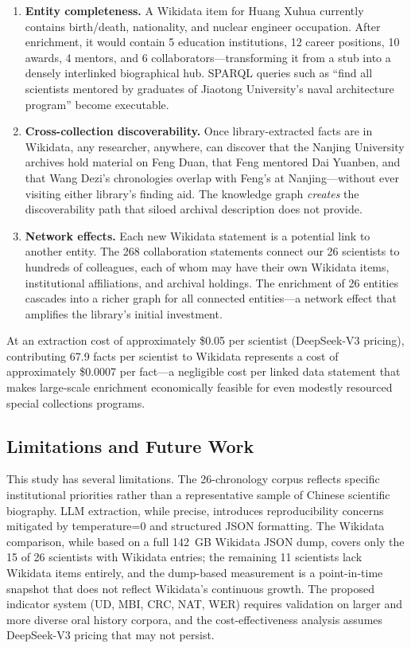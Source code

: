 \documentclass[review]{elsarticle}
\begin{document}
\begin{enumerate}[label=\textbf{D\arabic*:},leftmargin=*]
    \item \textbf{Entity completeness.} A Wikidata item for Huang Xuhua currently contains birth/death, nationality, and nuclear engineer occupation. After enrichment, it would contain 5 education institutions, 12 career positions, 10 awards, 4 mentors, and 6 collaborators—transforming it from a stub into a densely interlinked biographical hub. SPARQL queries such as ``find all scientists mentored by graduates of Jiaotong University's naval architecture program'' become executable.
    \item \textbf{Cross-collection discoverability.} Once library-extracted facts are in Wikidata, any researcher, anywhere, can discover that the Nanjing University archives hold material on Feng Duan, that Feng mentored Dai Yuanben, and that Wang Dezi's chronologies overlap with Feng's at Nanjing—without ever visiting either library's finding aid. The knowledge graph \textit{creates} the discoverability path that siloed archival description does not provide.
    \item \textbf{Network effects.} Each new Wikidata statement is a potential link to another entity. The 268 collaboration statements connect our 26 scientists to hundreds of colleagues, each of whom may have their own Wikidata items, institutional affiliations, and archival holdings. The enrichment of 26 entities cascades into a richer graph for all connected entities—a network effect that amplifies the library's initial investment.
\end{enumerate}

At an extraction cost of approximately \$0.05 per scientist (DeepSeek-V3 pricing), contributing 67.9 facts per scientist to Wikidata represents a cost of approximately \$0.0007 per fact—a negligible cost per linked data statement that makes large-scale enrichment economically feasible for even modestly resourced special collections programs.

\subsection{Limitations and Future Work}

This study has several limitations. The 26-chronology corpus reflects specific institutional priorities rather than a representative sample of Chinese scientific biography. LLM extraction, while precise, introduces reproducibility concerns mitigated by temperature=0 and structured JSON formatting. The Wikidata comparison, while based on a full 142~GB Wikidata JSON dump, covers only the 15 of 26 scientists with Wikidata entries; the remaining 11 scientists lack Wikidata items entirely, and the dump-based measurement is a point-in-time snapshot that does not reflect Wikidata's continuous growth. The proposed indicator system (UD, MBI, CRC, NAT, WER) requires validation on larger and more diverse oral history corpora, and the cost-effectiveness analysis assumes DeepSeek-V3 pricing that may not persist.
\end{document}
